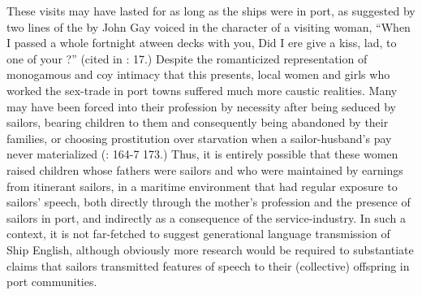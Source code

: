 These visits may have lasted for as long as the ships were in port, as suggested by two lines of the  by John Gay voiced in the character of a visiting woman, “When I passed a whole fortnight atween decks with you, Did I ere give a kiss, lad, to one of your ?” (cited in \citealt{Hugill1969}: 17.) Despite the romanticized representation of monogamous and coy intimacy that this  presents, local women and girls who worked the sex-trade in port towns suffered much more caustic realities. Many may have been forced into their profession by necessity after being seduced by sailors, bearing children to them and consequently being abandoned by their families, or choosing prostitution over starvation when a sailor-husband’s pay never materialized (\citealt{AdkinsAdkins2008}: 164-7 173.) Thus, it is entirely possible that these women raised children whose fathers were sailors and who were maintained by earnings from itinerant sailors, in a maritime environment that had regular exposure to sailors’ speech, both directly through the mother’s profession and the presence of sailors in port, and indirectly as a consequence of the service-industry. In such a context, it is not far-fetched to suggest generational language transmission of Ship English, although obviously more research would be required to substantiate claims that sailors transmitted features of speech to their (collective) offspring in port communities. 

